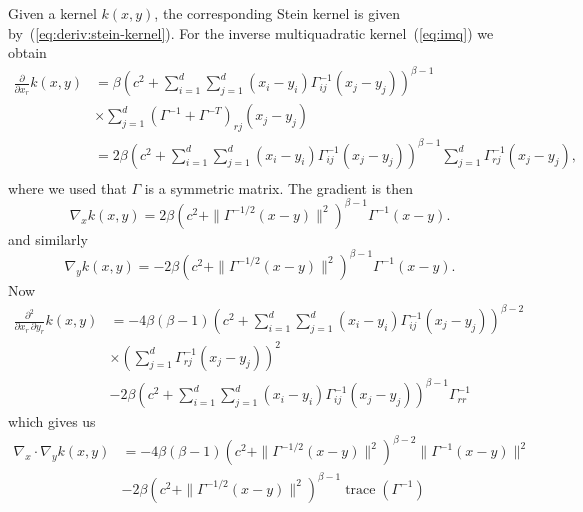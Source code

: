 \documentclass[12pt,a4paper]{report}
\DeclareMathOperator{\trace}{trace}
\begin{document}
Given a kernel $k(x,y)$, the corresponding Stein kernel is given by~(\ref{eq:deriv:stein-kernel}). For the inverse multiquadratic kernel~(\ref{eq:imq}) we obtain
\begin{equation}
\begin{aligned}
\frac{\partial}{\partial x_r} k(x,y) 
&= \beta \left(c^2 + \sum_{i=1}^d\sum_{j=1}^d (x_i-y_i) \Gamma^{-1}_{ij}(x_j-y_j)\right)^{\beta-1} \\
&\times \sum_{j=1}^d (\Gamma^{-1} + \Gamma^{-T})_{rj}(x_j - y_j) \\
&= 2 \beta \left(c^2 + \sum_{i=1}^d\sum_{j=1}^d (x_i-y_i) \Gamma^{-1}_{ij}(x_j-y_j)\right)^{\beta-1}
\sum_{j=1}^d \Gamma^{-1}_{rj}(x_j - y_j), \\
\end{aligned}
\end{equation}
where we used that $\Gamma$ is a symmetric matrix. The gradient is then
\begin{equation}
\nabla_x k(x,y) = 2 \beta \left(c^2 + \| \Gamma^{-1/2} (x-y)\|^2\right)^{\beta-1} \Gamma^{-1} (x - y).
\label{eq:appx:deviv:nablax}
\end{equation}
and similarly
\begin{equation}
\nabla_y k(x,y) = -2 \beta \left(c^2 + \| \Gamma^{-1/2} (x-y)\|^2\right)^{\beta-1} \Gamma^{-1} (x - y).
\label{eq:appx:deviv:nablay}
\end{equation}
Now
\begin{equation}
\begin{aligned}
\frac{\partial^2}{\partial x_r\,\partial y_r} k(x,y) 
&= -4 \beta(\beta-1) \left(c^2 + \sum_{i=1}^d\sum_{j=1}^d (x_i-y_i) \Gamma^{-1}_{ij}(x_j-y_j)\right)^{\beta-2} \\
&\times \left(\sum_{j=1}^d \Gamma^{-1}_{rj}(x_j - y_j)\right)^2 \\
&- 2\beta \left(c^2 + \sum_{i=1}^d\sum_{j=1}^d (x_i-y_i) \Gamma^{-1}_{ij}(x_j-y_j)\right)^{\beta-1} \Gamma^{-1}_{rr}
\end{aligned}
\end{equation}
which gives us
\begin{equation}
\begin{aligned}
\nabla_x \cdot \nabla_y k(x,y) 
&= -4 \beta(\beta-1) \left(c^2 + \| \Gamma^{-1/2}(x-y)\|^2\right)^{\beta-2} \| \Gamma^{-1}(x - y)\|^2 \\
&- 2\beta \left(c^2 + \|\Gamma^{-1/2}(x-y)\|^2\right)^{\beta-1} \trace(\Gamma^{-1})
\label{eq:appx:deriv:nablax_nablay}
\end{aligned}
\end{equation}
\end{document}
